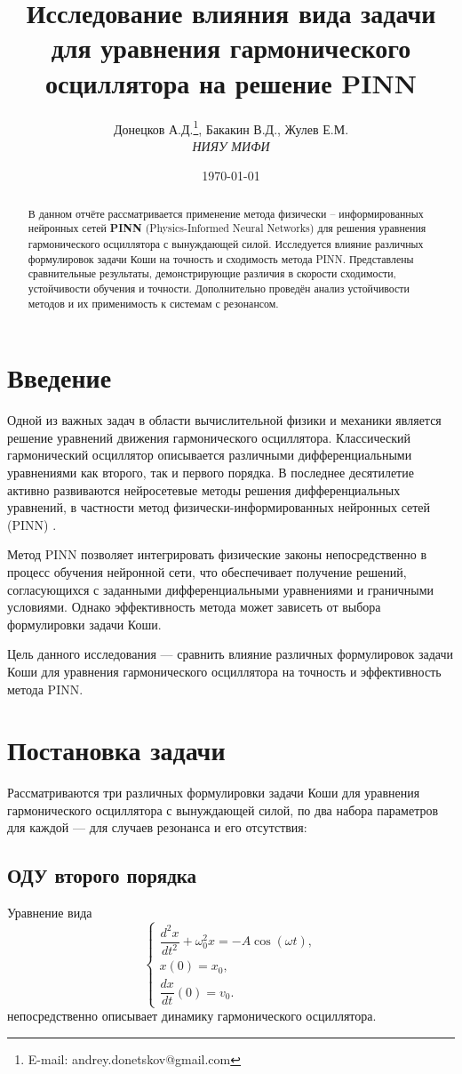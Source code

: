 \documentclass[12pt,a4paper]{article}
\title{Исследование влияния вида задачи для уравнения гармонического осциллятора на решение PINN}
\author{
Донецков А.Д.\thanks{E-mail: andrey.donetskov@gmail.com}, 
Бакакин В.Д., 
Жулев Е.М. \\
\textit{НИЯУ МИФИ}
}
\date{\today}
\begin{document}
\maketitle

\begin{abstract}
В данном отчёте рассматривается применение метода физически -- информированных нейронных сетей \textbf{PINN} (Physics-Informed Neural Networks) для решения уравнения гармонического осциллятора с вынуждающей силой. Исследуется влияние различных формулировок задачи Коши на точность и сходимость метода PINN. Представлены сравнительные результаты, демонстрирующие различия в скорости сходимости, устойчивости обучения и точности. Дополнительно проведён анализ устойчивости методов и их применимость к системам с резонансом.
\end{abstract}

\tableofcontents
\newpage

\section{Введение}
Одной из важных задач в области вычислительной физики и механики является решение уравнений движения гармонического осциллятора. Классический гармонический осциллятор описывается различными дифференциальными уравнениями как второго, так и первого порядка. В последнее десятилетие активно развиваются нейросетевые методы решения дифференциальных уравнений, в частности метод физически-информированных нейронных сетей (PINN) \cite{Lagaris1998,Raissi2019}.

Метод PINN позволяет интегрировать физические законы непосредственно в процесс обучения нейронной сети, что обеспечивает получение решений, согласующихся с заданными дифференциальными уравнениями и граничными условиями. Однако эффективность метода может зависеть от выбора формулировки задачи Коши.

Цель данного исследования --- сравнить влияние различных формулировок задачи Коши для уравнения гармонического осциллятора на точность и эффективность метода PINN.

\section{Постановка задачи}
Рассматриваются три различных формулировки задачи Коши для уравнения гармонического осциллятора с вынуждающей силой, по два набора параметров для каждой --- для случаев резонанса и его отсутствия:

\subsection{ОДУ второго порядка}
Уравнение вида
\begin{equation}
\begin{cases}
\dfrac{d^2x}{dt^2} + \omega_0^2 x = -A\cos(\omega t), \\
x(0) = x_0, \\
\dfrac{dx}{dt}(0) = v_0.
\end{cases}
\end{equation}
непосредственно описывает динамику гармонического осциллятора.
\end{document}
